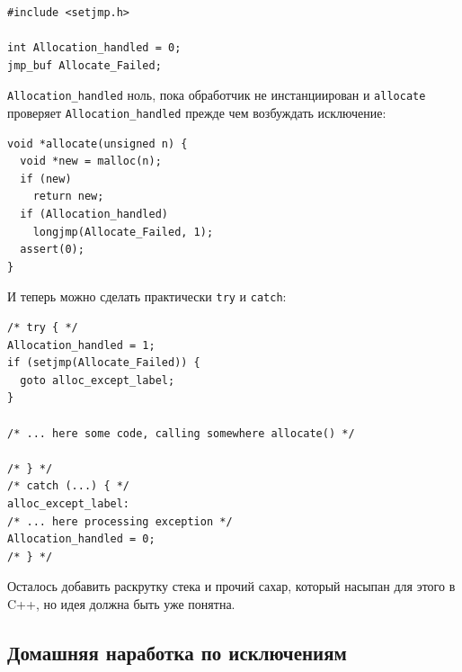 \documentclass[a4paper,12pt,oneside]{article}
\begin{document}
\begin{lstlisting}
#include <setjmp.h>

int Allocation_handled = 0;
jmp_buf Allocate_Failed;
\end{lstlisting}

\lstinline!Allocation_handled! ноль, пока обработчик не инстанциирован и \lstinline!allocate! проверяет \lstinline!Allocation_handled! прежде чем возбуждать исключение:

\begin{lstlisting}
void *allocate(unsigned n) {
  void *new = malloc(n);
  if (new)
    return new;
  if (Allocation_handled)
    longjmp(Allocate_Failed, 1);
  assert(0);
}
\end{lstlisting}

И теперь можно сделать практически \lstinline!try! и \lstinline!catch!:

\begin{lstlisting}
/* try { */
Allocation_handled = 1;
if (setjmp(Allocate_Failed)) {
  goto alloc_except_label;
}

/* ... here some code, calling somewhere allocate() */

/* } */
/* catch (...) { */
alloc_except_label:
/* ... here processing exception */
Allocation_handled = 0;
/* } */
\end{lstlisting}

Осталось добавить раскрутку стека и прочий сахар, который насыпан для этого в C++, но идея должна быть уже понятна.

\pagebreak
\subsection{Домашняя наработка по исключениям}
\end{document}
